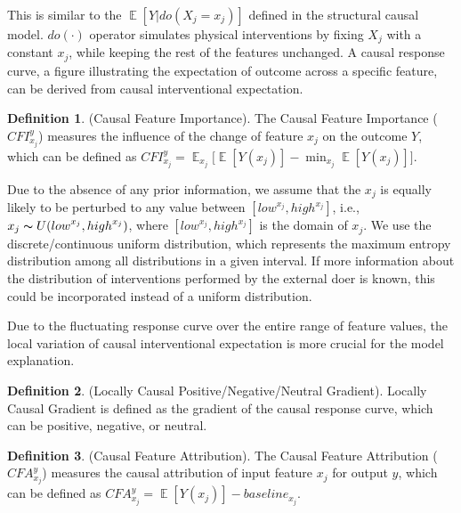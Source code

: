 \documentclass[letterpaper]{article} %
\DeclareMathOperator{\E}{\mathbb{E}}
\theoremstyle{definition}
\newtheorem{definition}{Definition}
\theoremstyle{remark}
\begin{document}
This is similar to the $\E[Y|do(X_j=x_j)]$ defined in the structural causal model. $do(\cdot)$ operator simulates physical interventions by fixing $X_j$ with a constant $x_j$, while keeping the rest of the features unchanged. A causal response curve, a figure illustrating the expectation of outcome across a specific feature, can be derived from causal interventional expectation.



\theoremstyle{definition}
\begin{definition}({Causal Feature Importance}).
The Causal Feature Importance ($CFI^y_{x_j}$) measures the influence of the change of feature $x_j$ on the outcome $Y$, which can be defined as $CFI^y_{x_j} = \E_{x_j} \Bigr[ \E [Y(x_j)] - \min_{x_j} \E[Y(x_j)] \Bigr] $.
\label{def: causal importance}
\end{definition}

Due to the absence of any prior information, we assume that the $x_j$ is equally likely to be perturbed to any value between $[{low}^{x_j}, {high}^{x_j}]$, i.e., $x_j \thicksim U({low}^{x_j}, {high}^{x_j})$, where $[{low}^{x_j}, {high}^{x_j}]$ is the domain of $x_j $. We use the discrete/continuous uniform distribution, which represents the maximum entropy distribution among all distributions in a given interval. If more information about the distribution of interventions performed by the external doer is known, this could be incorporated instead of a uniform distribution.

Due to the fluctuating response curve over the entire range of feature values, the local variation of causal interventional expectation is more crucial for the model explanation. 

\theoremstyle{definition}
\begin{definition}({Locally Causal Positive/Negative/Neutral Gradient}). Locally Causal Gradient is defined as the gradient of the causal response curve, which can be positive, negative, or neutral. 
\label{def: causal attribution}
\end{definition}

\theoremstyle{definition}
\begin{definition}({Causal Feature Attribution}).
The Causal Feature Attribution ($CFA^y_{x_j}$) measures the causal attribution of input feature $x_j$ for output $y$, which can be defined as $ CFA^y_{x_j} =  \E [Y(x_j)] - {baseline}_{x_j}  $.
\label{def: causal attribution}
\end{definition}
\end{document}
